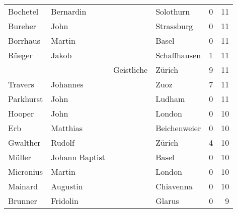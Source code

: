 \begin{tabular}{llllrr}
                 Bochetel &                          Bernardin &             &                                   Solothurn &          0 &        11 \\
                  Bureher &                               John &             &                                  Strassburg &          0 &        11 \\
                 Borrhaus &                             Martin &             &                                       Basel &          0 &        11 \\
                   Rüeger &                              Jakob &             &                                Schaffhausen &          1 &        11 \\
                          &                                    &  Geistliche &                                      Zürich &          9 &        11 \\
                  Travers &                           Johannes &             &                                        Zuoz &          7 &        11 \\
                Parkhurst &                               John &             &                                      Ludham &          0 &        11 \\
                   Hooper &                               John &             &                                      London &          0 &        10 \\
                      Erb &                           Matthias &             &                                Beichenweier &          0 &        10 \\
                 Gwalther &                             Rudolf &             &                                      Zürich &          4 &        10 \\
                   Müller &                     Johann Baptist &             &                                       Basel &          0 &        10 \\
                Micronius &                             Martin &             &                                      London &          0 &        10 \\
                  Mainard &                           Augustin &             &                                   Chiavenna &          0 &        10 \\
                  Brunner &                           Fridolin &             &                                      Glarus &          0 &         9 \\

\end{tabular}
